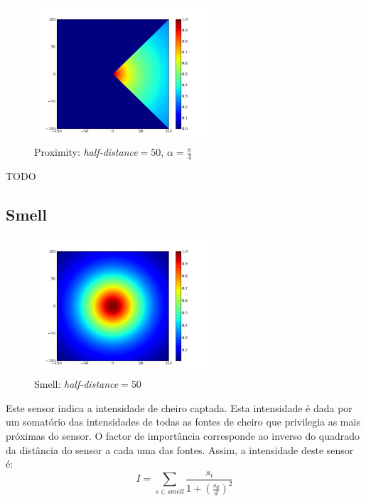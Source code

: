 \documentclass[a4paper]{article}
\begin{document}
\begin{figure}[h]
	\vspace{-20pt}
	\begin{center}
		\includegraphics[width=0.6\textwidth]{graphs/sensors/proximity.png}
	\end{center}
	\vspace{-20pt}
	\caption{Proximity: \emph{half-distance}$=50$, $\alpha=\frac{\pi}{4}$}
\end{figure}

TODO

\cleardoublepage
\subsection{Smell}
\begin{figure}[h]
	\vspace{-20pt}
	\begin{center}
		\includegraphics[width=0.6\textwidth]{graphs/sensors/smell.png}
	\end{center}
	\vspace{-20pt}
	\caption{Smell: \emph{half-distance}$=50$}
\end{figure}

\indent Este sensor indica a intensidade de cheiro captada. Esta intensidade é dada por um somatório das intensidades de todas as fontes de cheiro que privilegia as mais próximas do sensor. O factor de importância corresponde ao inverso do quadrado da distância do sensor a cada uma das fontes.
Assim, a intensidade deste sensor é:
\[
	I = \displaystyle\sum\limits_{s \in smell} \frac{s_{i}}{1 + (\frac{s_{d}}{d})^{2}}
\] 
\end{document}
